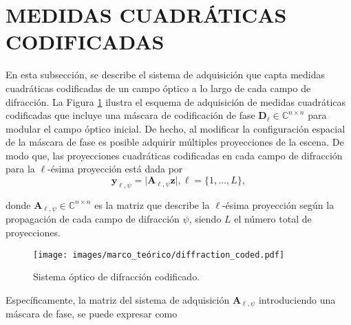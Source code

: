 

\section{MEDIDAS CUADRÁTICAS CODIFICADAS}
En esta subsección, se describe el sistema de adquisición que capta medidas cuadráticas codificadas de un campo óptico a lo largo de cada campo de difracción. La Figura \ref{fig:coded_difraction_systems} ilustra el esquema de adquisición de medidas cuadráticas codificadas que incluye una máscara de codificación de fase $\mathbf{D}_\ell \in \mathbb{C}^{n\times n}$ para modular el campo óptico inicial. De hecho, al modificar la configuración espacial de la máscara de fase es posible adquirir múltiples proyecciones de la escena. De modo que, las proyecciones cuadráticas codificadas en cada campo de difracción para la $\ell$-ésima proyección está dada por 
\begin{equation}
    \mathbf{y}_{\ell, \psi} = \vert \mathbf{A}_{\ell, \psi}\mathbf{z} \vert, \ell=\{1,\dots,L\},
    \label{eq:phase_retrieval_problem}
\end{equation}

donde $\mathbf{A}_{\ell, \psi}\in\mathbb{C}^{n\times n}$ es la matriz que describe la $\ell$-ésima proyección según la propagación de cada campo de difracción $\psi$, siendo $L$ el número total de proyecciones. 
\begin{figure}[!h]
    \centering
    \caption{\hspace{2mm}Sistema óptico de difracción codificado.}
    \texttt{[image: images/marco\_teórico/diffraction\_coded.pdf]}
    \label{fig:coded_difraction_systems}
\end{figure}

Específicamente, la matriz del sistema de adquisición $\mathbf{A}_{\ell, \psi}$ introduciendo una máscara de fase, se puede expresar como


